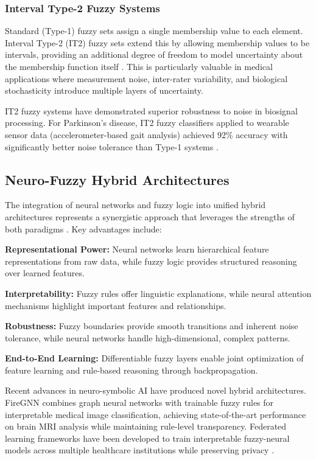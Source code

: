 \documentclass[conference]{IEEEtran}
\begin{document}
\subsubsection{Interval Type-2 Fuzzy Systems}

Standard (Type-1) fuzzy sets assign a single membership value to each element. Interval Type-2 (IT2) fuzzy sets extend this by allowing membership values to be intervals, providing an additional degree of freedom to model uncertainty about the membership function itself \cite{Kuncheva1999}. This is particularly valuable in medical applications where measurement noise, inter-rater variability, and biological stochasticity introduce multiple layers of uncertainty.

IT2 fuzzy systems have demonstrated superior robustness to noise in biosignal processing. For Parkinson's disease, IT2 fuzzy classifiers applied to wearable sensor data (accelerometer-based gait analysis) achieved 92\% accuracy with significantly better noise tolerance than Type-1 systems \cite{Nimmala2025}.

\subsection{Neuro-Fuzzy Hybrid Architectures}

The integration of neural networks and fuzzy logic into unified hybrid architectures represents a synergistic approach that leverages the strengths of both paradigms \cite{Zadeh1994}. Key advantages include:

\textbf{Representational Power:} Neural networks learn hierarchical feature representations from raw data, while fuzzy logic provides structured reasoning over learned features.

\textbf{Interpretability:} Fuzzy rules offer linguistic explanations, while neural attention mechanisms highlight important features and relationships.

\textbf{Robustness:} Fuzzy boundaries provide smooth transitions and inherent noise tolerance, while neural networks handle high-dimensional, complex patterns.

\textbf{End-to-End Learning:} Differentiable fuzzy layers enable joint optimization of feature learning and rule-based reasoning through backpropagation.

Recent advances in neuro-symbolic AI have produced novel hybrid architectures. FireGNN \cite{Sengupta2025} combines graph neural networks with trainable fuzzy rules for interpretable medical image classification, achieving state-of-the-art performance on brain MRI analysis while maintaining rule-level transparency. Federated learning frameworks have been developed to train interpretable fuzzy-neural models across multiple healthcare institutions while preserving privacy \cite{Ducange2024}.
\end{document}
